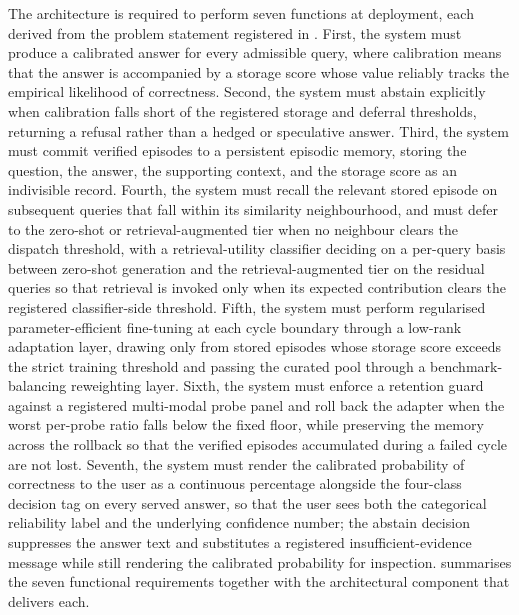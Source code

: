 The architecture is required to perform seven functions at deployment, each derived from the problem statement registered in . First, the system must produce a calibrated answer for every admissible query, where calibration means that the answer is accompanied by a storage score whose value reliably tracks the empirical likelihood of correctness. Second, the system must abstain explicitly when calibration falls short of the registered storage and deferral thresholds, returning a refusal rather than a hedged or speculative answer. Third, the system must commit verified episodes to a persistent episodic memory, storing the question, the answer, the supporting context, and the storage score as an indivisible record. Fourth, the system must recall the relevant stored episode on subsequent queries that fall within its similarity neighbourhood, and must defer to the zero-shot or retrieval-augmented tier when no neighbour clears the dispatch threshold, with a retrieval-utility classifier deciding on a per-query basis between zero-shot generation and the retrieval-augmented tier on the residual queries so that retrieval is invoked only when its expected contribution clears the registered classifier-side threshold. Fifth, the system must perform regularised parameter-efficient fine-tuning at each cycle boundary through a low-rank adaptation layer, drawing only from stored episodes whose storage score exceeds the strict training threshold and passing the curated pool through a benchmark-balancing reweighting layer. Sixth, the system must enforce a retention guard against a registered multi-modal probe panel and roll back the adapter when the worst per-probe ratio falls below the fixed floor, while preserving the memory across the rollback so that the verified episodes accumulated during a failed cycle are not lost. Seventh, the system must render the calibrated probability of correctness to the user as a continuous percentage alongside the four-class decision tag on every served answer, so that the user sees both the categorical reliability label and the underlying confidence number; the abstain decision suppresses the answer text and substitutes a registered insufficient-evidence message while still rendering the calibrated probability for inspection.  summarises the seven functional requirements together with the architectural component that delivers each.

